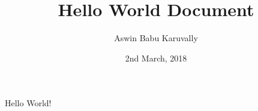 \documentclass{article}
\title{Hello World Document}
\author{Aswin Babu Karuvally}
\date{2nd March, 2018}
\begin{document}
    Hello World!
\end{document}
